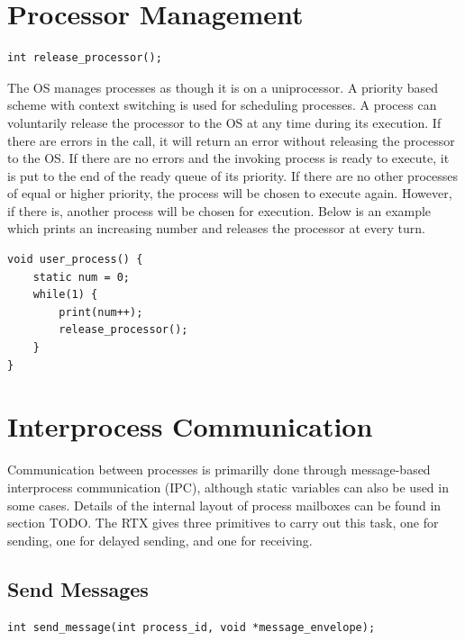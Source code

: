 \documentclass[12pt,twocolumn]{report}
\begin{document}
\bigskip

\section{Processor Management}
\begin{lstlisting}
int release_processor();
\end{lstlisting}

\par The OS manages processes as though it is on a uniprocessor. A priority based scheme with context switching is used for scheduling processes. A process can voluntarily release the processor to the OS at any time during its execution. If there are errors in the call, it will return an error without releasing the processor to the OS. If there are no errors and the invoking process is ready to execute, it is put to the end of the ready queue of its priority. If there are no other processes of equal or higher priority, the process will be chosen to execute again. However, if there is, another process will be chosen for execution. Below is an example which prints an increasing number and releases the processor at every turn.

\begin{lstlisting}
void user_process() {
    static num = 0;
    while(1) {
        print(num++);
        release_processor();
    }
}
\end{lstlisting}

\section{Interprocess Communication}
\par Communication between processes is primarilly done through message-based interprocess communication (IPC), although static variables can also be used in some cases. Details of the internal layout of process mailboxes can be found in section TODO. The RTX gives three primitives to carry out this task, one for sending, one for delayed sending, and one for receiving.

\subsection{Send Messages}
\label{sec:send_message}
\begin{lstlisting}
int send_message(int process_id, void *message_envelope);
\end{lstlisting}
\end{document}
